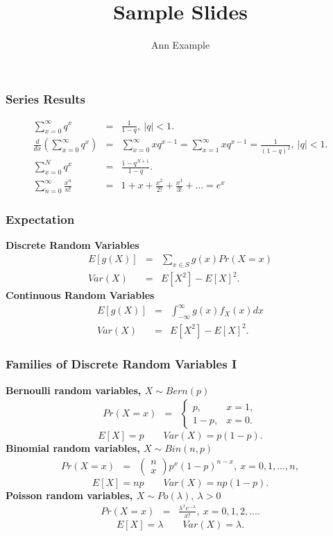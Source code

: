 \documentclass[compress]{beamer}
\title{Sample Slides}
\author{Ann Example}
\institute{}
\date{}
\begin{document}
\begin{frame}[t]
	\frametitle{Series Results}
	\begin{eqnarray*}
		\sum_{x=0}^{\infty} q^x &=& \frac{1}{1-q}, \ |q|<1. \\
		\frac{d}{dx}\left(\sum_{x=0}^{\infty} q^x \right) &=& \sum_{x=0}^{\infty} xq^{x-1}=\sum_{x=1}^{\infty} xq^{x-1} = \frac{1}{(1-q)^2}, \ |q|<1. \\
		\sum_{x=0}^{N} q^x &=& \frac{1-q^{N+1}}{1-q}. \\
		\sum_{n=0}^{\infty} \frac{x^n}{n!} &=& 1+x+\frac{x^2}{2!}+\frac{x^3}{3!}+\ldots = e^x
	\end{eqnarray*}
\end{frame}

\begin{frame}[t]
\frametitle{Expectation}
{\bf Discrete Random Variables}
\begin{eqnarray*}
E[g(X)] &=& \sum_{x \in S} g(x) Pr(X=x) \\
Var(X)  &=& E[X^2] - E[X]^2.
\end{eqnarray*}
{\bf Continuous Random Variables}
\begin{eqnarray*}
E[g(X)] &=&  \int_{-\infty}^{\infty} g(x) f_X(x) dx \\
Var(X)  &=& E[X^2]-E[X]^2.
\end{eqnarray*}
\end{frame}

\begin{frame}[t]
\frametitle{Families of Discrete Random Variables I}
{\bf Bernoulli random variables, $X \sim Bern(p)$}
\begin{eqnarray*}
Pr(X=x) &=& \left\{ \begin{array}{cc} p, & x=1, \\ 1-p, & x=0. \end{array} \right.
\end{eqnarray*}
\[
E[X] = p \qquad Var(X) = p(1-p).
\]
{\bf Binomial random variables, $X \sim Bin(n,p)$} 
\begin{eqnarray*}
Pr(X=x) &=& \left( \begin{array}{c} n \\ x
      \end{array} \right) p^x (1-p)^{n-x},\  x=0,1,\ldots,n,
\end{eqnarray*}
\[
E[X] = np \qquad Var(X) = np(1-p).
\]
{\bf Poisson random variables, $X \sim Po(\lambda), \ \lambda>0$}
\begin{eqnarray*}
Pr(X=x) &=& \frac{\lambda^x e^{-\lambda}}{x!}, \ x=0,1,2,\ldots.
\end{eqnarray*}
\[
E[X] = \lambda \qquad Var(X) = \lambda.
\]
\end{frame}
\end{document}
